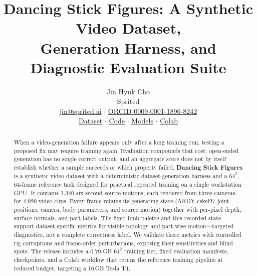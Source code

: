 \documentclass[10pt,twocolumn]{article}
\title{\vspace{-1.5em}\textbf{Dancing Stick Figures: A Synthetic Video Dataset,\\Generation Harness, and Diagnostic Evaluation Suite}}
\author{Jin Hyuk Cho\\Sprited\\\small\href{mailto:jin@sprited.ai}{jin@sprited.ai} $\cdot$
\href{https://orcid.org/0009-0001-1896-8242}{ORCID 0009-0001-1896-8242}\\[-2pt]
\small\href{https://huggingface.co/datasets/sprited/dancing-stick-figures}{Dataset} $\cdot$
\href{https://github.com/sprited-ai/dancing-stick-figures}{Code} $\cdot$
\href{https://huggingface.co/sprited/dancing-stick-figures-baselines}{Models} $\cdot$
\href{https://colab.research.google.com/github/sprited-ai/dancing-stick-figures/blob/main/notebooks/dancing_stick_figures_colab_v0_3.ipynb}{Colab}}
\date{}
\begin{document}
\raggedbottom\maketitle\vspace{-1.25em}
\begin{abstract}
When a video-generation failure appears only after a long training run, testing a proposed fix may require
training again. Evaluation compounds that cost: open-ended generation has no single correct output, and an
aggregate score does not by itself establish whether a sample succeeds or which property failed. \textbf{Dancing
Stick Figures} is a synthetic video dataset with a deterministic dataset-generation harness and a $64^2$, 64-frame
reference task designed for practical repeated training on a single workstation GPU. It contains 1,340 six-second source motions,
each rendered from three cameras, for 4,020 video clips.
Every frame retains its generating state (ARDY cskel27 joint positions, camera, body parameters, and source motion) together with
per-pixel depth, surface normals, and part labels. The fixed limb palette and this recorded state support
dataset-specific metrics for visible topology and part-wise motion---targeted diagnostics, not a complete
correctness label. We validate these metrics with controlled rig corruptions and frame-order perturbations,
exposing their sensitivities and blind spots. The release includes a 0.79-GB $64^2$ training tier, fixed
evaluation manifests, checkpoints, and a Colab workflow that reruns the reference training pipeline at
reduced budget, targeting a 16\,GB Tesla T4.
\end{abstract}
\end{document}
